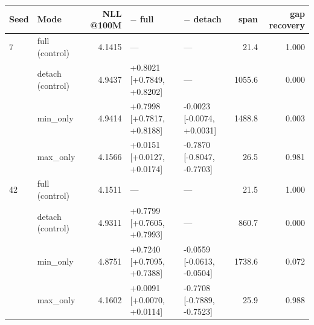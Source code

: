 \begin{tabular}{llrllrr}
\toprule
Seed & Mode & NLL @100M & $-$ full & $-$ detach & span & gap recovery \\
\midrule
7 & full (control) & 4.1415 & --- & --- & 21.4 & 1.000 \\
 & detach (control) & 4.9437 & +0.8021 [+0.7849, +0.8202] & --- & 1055.6 & 0.000 \\
 & min\_only & 4.9414 & +0.7998 [+0.7817, +0.8188] & -0.0023 [-0.0074, +0.0031] & 1488.8 & 0.003 \\
 & max\_only & 4.1566 & +0.0151 [+0.0127, +0.0174] & -0.7870 [-0.8047, -0.7703] & 26.5 & 0.981 \\
\midrule
42 & full (control) & 4.1511 & --- & --- & 21.5 & 1.000 \\
 & detach (control) & 4.9311 & +0.7799 [+0.7605, +0.7993] & --- & 860.7 & 0.000 \\
 & min\_only & 4.8751 & +0.7240 [+0.7095, +0.7388] & -0.0559 [-0.0613, -0.0504] & 1738.6 & 0.072 \\
 & max\_only & 4.1602 & +0.0091 [+0.0070, +0.0114] & -0.7708 [-0.7889, -0.7523] & 25.9 & 0.988 \\
\bottomrule
\end{tabular}
